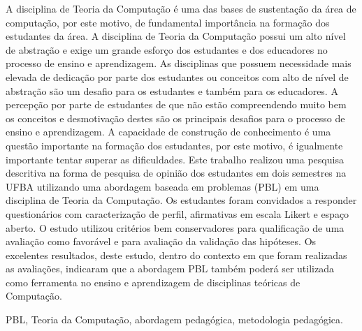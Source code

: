 \resumo
A disciplina de Teoria da Computação é uma das bases de
sustentação da área de computação, por este motivo, de
fundamental importância na formação dos estudantes
da área.
A disciplina de Teoria da Computação possui
um alto nível de abstração e exige um grande esforço
dos estudantes e dos educadores no processo de
ensino e aprendizagem.
As disciplinas que possuem necessidade mais elevada de dedicação
por parte dos estudantes ou conceitos com alto de nível de abstração
são um desafio para os estudantes e também para os educadores.
A percepção por parte de estudantes de
que não estão compreendendo muito bem os conceitos e
desmotivação destes são os principais desafios para o processo
de ensino e aprendizagem.
A capacidade de construção de conhecimento é uma
questão importante na formação dos estudantes, por este
motivo, é igualmente importante tentar superar as
dificuldades.
Este trabalho realizou uma pesquisa descritiva na forma
de pesquisa de opinião dos estudantes em dois semestres
na \ac{UFBA} utilizando uma abordagem baseada
em problemas (\ac{PBL}) em uma disciplina de Teoria da
Computação.
Os estudantes foram convidados a responder questionários com
caracterização de perfil, afirmativas em escala Likert e
espaço aberto.
O estudo utilizou critérios bem conservadores para qualificação
de uma avaliação como favorável e para avaliação da validação das
hipóteses.
Os excelentes resultados, deste estudo, dentro do contexto
em que foram realizadas as avaliações, indicaram que a
abordagem \ac{PBL} também poderá ser utilizada como ferramenta
no ensino e aprendizagem de disciplinas teóricas
de Computação.

\begin{keywords}
\ac{PBL}, Teoria da Computação, abordagem pedagógica, metodologia pedagógica.
\end{keywords}
